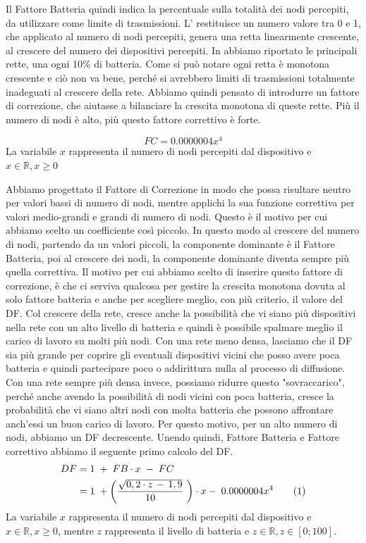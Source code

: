 Il Fattore Batteria quindi indica la percentuale sulla totalità dei nodi percepiti, da utilizzare come limite di trasmissioni. L' restituisce un numero valore tra 0 e 1, che applicato al numero di nodi percepiti, genera una retta linearmente crescente, al crescere del numero dei dispositivi percepiti. In  abbiamo riportato le principali rette, una ogni 10\% di batteria. Come si può notare ogni retta è monotona crescente e ciò non va bene, perché si avrebbero limiti di trasmissioni totalmente inadeguati al crescere della rete. Abbiamo quindi pensato di introdurre un fattore di correzione, che aiutasse a bilanciare la crescita monotona di queste rette. Più il numero di nodi è alto, più questo fattore correttivo è forte.
\medskip

\begin{equation}
	\label{eq:df_FC}
	FC = 0.0000004x^4
\end{equation}
La variabile $\textit{x}$ rappresenta il numero di nodi percepiti dal dispositivo e $ \textit{x}\in\mathbb{R},x\geq0$

Abbiamo progettato il Fattore di Correzione in modo che possa risultare neutro per valori bassi di numero di nodi, mentre applichi la sua funzione correttiva per valori medio-grandi e grandi di numero di nodi. Questo è il motivo per cui abbiamo scelto un coefficiente così piccolo. In questo modo al crescere del numero di nodi, partendo da un valori piccoli, la componente dominante è il Fattore Batteria, poi al crescere dei nodi, la componente dominante diventa sempre più quella correttiva. Il motivo per cui abbiamo scelto di inserire questo fattore di correzione, è che ci serviva qualcosa per gestire la crescita monotona dovuta al solo fattore batteria e anche per scegliere meglio, con più criterio, il valore del DF. Col crescere della rete, cresce anche la possibilità che vi siano più dispositivi nella rete con un alto livello di batteria e quindi è possibile spalmare meglio il carico di lavoro su molti più nodi. Con una rete meno densa, lasciamo che il DF sia più grande per coprire gli eventuali dispositivi vicini che posso avere poca batteria e quindi partecipare poco o addirittura nulla al processo di diffusione. Con una rete sempre più densa invece, possiamo ridurre questo "sovraccarico", perché anche avendo la possibilità di nodi vicini con poca batteria, cresce la probabilità che vi siano altri nodi con molta batteria che possono affrontare anch'essi un buon carico di lavoro. Per questo motivo, per un alto numero di nodi, abbiamo un DF decrescente.
Unendo quindi, Fattore Batteria e Fattore correttivo abbiamo il seguente primo calcolo del DF.
\begin{align*}
	\label{eq:DF_no_asint}
	DF &= 1 \; + \; FB\cdot x \; - \; FC\\
	&= 1 \; + \left( \dfrac{\sqrt{0,2\cdot z\,-\,1,9}}{10}\; \right) \cdot x- \; 0.0000004x^4 \addtocounter{equation}{1}\tag{\theequation}
\end{align*}
La variabile $\textit{x}$ rappresenta il numero di nodi percepiti dal dispositivo e $ \textit{x}\in\mathbb{R},x\geq0$, mentre $\textit{z}$ rappresenta il livello di batteria e $\textit{z}\in \mathbb{R}, \textit{z}\in[0;100]$.

